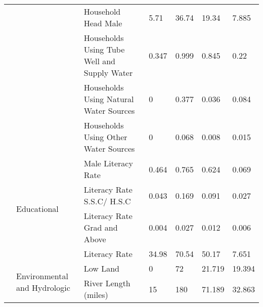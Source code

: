 \begin{table*}[!ht]
{\begin{threeparttable}
\begin{tabular}{|l|l|l|l|l|l|l|}
                            &                                           & Household Head Male                             & 5.71             & 36.74           & 19.34        & 7.885                       \\ \cline{3-7} 
                            &                                           & Households Using Tube Well and Supply Water                & 0.347            & 0.999            & 0.845         & 0.22                        \\ \cline{3-7} 
                            &                                           & Households Using Natural Water Sources                    & 0                & 0.377            & 0.036         & 0.084                       \\ \cline{3-7} 
                            &                                           & Households Using Other Water Sources            & 0                & 0.068            & 0.008         & 0.015                       \\ \cline{2-7} 
                            & \multirow{4}{*}{Educational}              & Male Literacy Rate\tnote{*}                              & 0.464            & 0.765            & 0.624         & 0.069                       \\ \cline{3-7} 
                            &                                           & Literacy Rate S.S.C/ H.S.C\tnote{*}                      & 0.043            & 0.169            & 0.091         & 0.027                       \\ \cline{3-7} 
                            &                                           & Literacy Rate Grad and Above                    & 0.004            & 0.027            & 0.012         & 0.006                       \\ \cline{3-7} 
                            &                                           & Literacy Rate                                   & 34.98            & 70.54            & 50.17        & 7.651                       \\ \cline{2-7} 
                            & \multirow{5}{*}{Environmental and Hydrologic}            & Low Land\tnote{*}                                        & 0                & 72               & 21.719        & 19.394                      \\ \cline{3-7} 
                            &                                           & River Length (miles)\tnote{*}                            & 15               & 180              & 71.189        & 32.863                      \\ \cline{3-7} 

\end{tabular}
\end{threeparttable}}
\end{table*}
